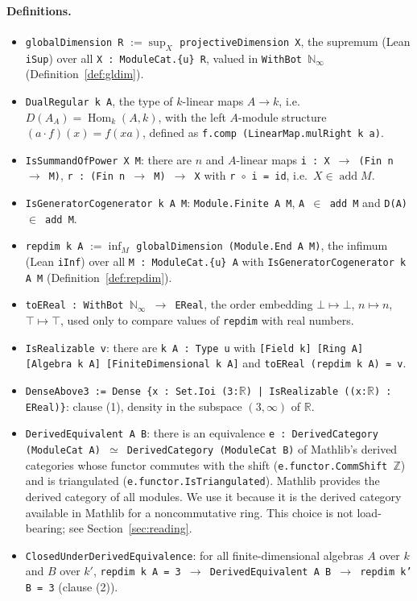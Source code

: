\documentclass[11pt]{article}
\theoremstyle{definition}
\theoremstyle{remark}
\renewcommand{\_}{\oldus\allowbreak}
\newcommand{\add}{\operatorname{add}}
\newcommand{\Hom}{\operatorname{Hom}}
\begin{document}
\paragraph{Definitions.}
\begin{itemize}
  \item \texttt{globalDimension R} $:= \sup_{X}$ \texttt{projectiveDimension X}, the supremum
        (Lean \texttt{iSup}) over all \texttt{X : ModuleCat.\{u\} R}, valued in
        \texttt{WithBot $\mathbb{N}_\infty$} (Definition~\ref{def:gldim}).
  \item \texttt{DualRegular k A}, the type of $k$-linear maps $A \to k$, i.e.\ $D(A_A)=\Hom_k(A,k)$, with the left $A$-module
        structure $(a\cdot f)(x) = f(xa)$, defined as \texttt{f.comp (LinearMap.mulRight k a)}.
  \item \texttt{IsSummandOfPower X M}: there are $n$ and $A$-linear maps
        \texttt{i : X $\to$ (Fin n $\to$ M)}, \texttt{r : (Fin n $\to$ M) $\to$ X} with
        \texttt{r $\circ$ i = id}, i.e.\ $X \in \add M$.
  \item \texttt{IsGeneratorCogenerator k A M}: \texttt{Module.Finite A M}, \texttt{A $\in$ add M} and
        \texttt{D(A) $\in$ add M}.
  \item \texttt{repdim k A} $:= \inf_{M}$ \texttt{globalDimension (Module.End A M)}, the infimum
        (Lean \texttt{iInf}) over all \texttt{M : ModuleCat.\{u\} A} with
        \texttt{IsGeneratorCogenerator k A M} (Definition~\ref{def:repdim}).
  \item \texttt{toEReal : WithBot $\mathbb{N}_\infty$ $\to$ EReal}, the order embedding
        $\bot\mapsto\bot$, $n\mapsto n$, $\top\mapsto\top$, used only to compare values of
        \texttt{repdim} with real numbers.
  \item \texttt{IsRealizable v}: there are \texttt{k A : Type u} with \texttt{[Field k] [Ring A]
        [Algebra k A] [FiniteDimensional k A]} and \texttt{toEReal (repdim k A) = v}.
  \item \texttt{DenseAbove3 := Dense \{x : Set.Ioi (3:$\mathbb{R}$) | IsRealizable ((x:$\mathbb{R}$) :
        EReal)\}}: clause (1), density in the subspace $(3,\infty)$ of $\mathbb{R}$.
  \item \texttt{DerivedEquivalent A B}: there is an equivalence
        \texttt{e : DerivedCategory (ModuleCat A) $\simeq$ DerivedCategory (ModuleCat B)} of Mathlib's
        derived categories whose functor commutes with the shift
        (\texttt{e.functor.CommShift $\mathbb{Z}$}) and is triangulated
        (\texttt{e.functor.IsTriangulated}). Mathlib provides the derived category of all modules. We
        use it because it is the derived category available in Mathlib for a noncommutative ring. This
        choice is not load-bearing; see Section~\ref{sec:reading}.
  \item \texttt{ClosedUnderDerivedEquivalence}: for all finite-dimensional algebras $A$ over $k$ and $B$
        over $k'$, \texttt{repdim k A = 3 $\to$ DerivedEquivalent A B $\to$ repdim k' B = 3}
        (clause (2)).
\end{itemize}
\end{document}
